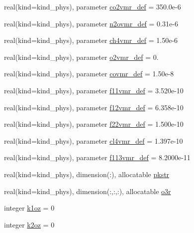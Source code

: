 \begin{DoxyCompactItemize}
\item 
real(kind=kind\+\_\+phys), parameter \hyperlink{namespacemodule__radiation__gases_a4fb5ca2e3bfaed7848d7602a22499e76}{co2vmr\+\_\+def} = 350.\+0e-\/6
\item 
real(kind=kind\+\_\+phys), parameter \hyperlink{namespacemodule__radiation__gases_a858ad802efe755f8b4b5bde85996b6ae}{n2ovmr\+\_\+def} = 0.\+31e-\/6
\item 
real(kind=kind\+\_\+phys), parameter \hyperlink{namespacemodule__radiation__gases_aad928d9e0064905a0b6e1eb8bb59bd23}{ch4vmr\+\_\+def} = 1.\+50e-\/6
\item 
real(kind=kind\+\_\+phys), parameter \hyperlink{namespacemodule__radiation__gases_a910898e96b8afe92ebc82ce62ba682d8}{o2vmr\+\_\+def} = 0.
\item 
real(kind=kind\+\_\+phys), parameter \hyperlink{namespacemodule__radiation__gases_a3554bdf03f8222d425bb6c946244cbb5}{covmr\+\_\+def} = 1.\+50e-\/8
\item 
real(kind=kind\+\_\+phys), parameter \hyperlink{namespacemodule__radiation__gases_a23ae6bb6860bfefef0c281b7106f521e}{f11vmr\+\_\+def} = 3.\+520e-\/10
\item 
real(kind=kind\+\_\+phys), parameter \hyperlink{namespacemodule__radiation__gases_a96d4f78070f30010626e0824b3421250}{f12vmr\+\_\+def} = 6.\+358e-\/10
\item 
real(kind=kind\+\_\+phys), parameter \hyperlink{namespacemodule__radiation__gases_afd0018e96811ac64ef2abd8cab821eb5}{f22vmr\+\_\+def} = 1.\+500e-\/10
\item 
real(kind=kind\+\_\+phys), parameter \hyperlink{namespacemodule__radiation__gases_a013f8faaee6df0c7c032e1786770c110}{cl4vmr\+\_\+def} = 1.\+397e-\/10
\item 
real(kind=kind\+\_\+phys), parameter \hyperlink{namespacemodule__radiation__gases_a76ec88dc6284c48cfaae6cd05428b6dd}{f113vmr\+\_\+def} = 8.\+2000e-\/11
\item 
real(kind=kind\+\_\+phys), dimension(\+:), allocatable \hyperlink{namespacemodule__radiation__gases_ac7466def3963591ebfc48298806b1f6a}{pkstr}
\item 
real(kind=kind\+\_\+phys), dimension(\+:,\+:,\+:), allocatable \hyperlink{namespacemodule__radiation__gases_ad18392d991a9ef4b6ff0e8e822176a18}{o3r}
\item 
integer \hyperlink{namespacemodule__radiation__gases_a0a14666484f230d3506a9b4740e2eeda}{k1oz} = 0
\item 
integer \hyperlink{namespacemodule__radiation__gases_a0c3727c9e2a0bec46e84622c4591cd8b}{k2oz} = 0

\end{DoxyCompactItemize}
